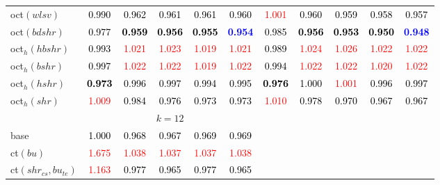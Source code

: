 \begin{tabular}[t]{l|>{}cccc>{}c|ccccc}
oct$(wlsv)$ & \textcolor{black}{0.990} & \textcolor{black}{0.962} & \textcolor{black}{0.961} & \textcolor{black}{0.961} & \textcolor{black}{0.960} & \textcolor{red}{1.001} & \textcolor{black}{0.960} & \textcolor{black}{0.959} & \textcolor{black}{0.958} & \textcolor{black}{0.957}\\
oct$(bdshr)$ & \textcolor{black}{0.977} & \textcolor{black}{\textbf{0.959}} & \textcolor{black}{\textbf{0.956}} & \textcolor{black}{\textbf{0.955}} & \textcolor{blue}{\textbf{0.954}} & \textcolor{black}{0.985} & \textcolor{black}{\textbf{0.956}} & \textcolor{black}{\textbf{0.953}} & \textcolor{black}{\textbf{0.950}} & \textcolor{blue}{\textbf{0.948}}\\
oct$_h(hbshr)$ & \textcolor{black}{0.993} & \textcolor{red}{1.021} & \textcolor{red}{1.023} & \textcolor{red}{1.019} & \textcolor{red}{1.021} & \textcolor{black}{0.989} & \textcolor{red}{1.024} & \textcolor{red}{1.026} & \textcolor{red}{1.022} & \textcolor{red}{1.022}\\
oct$_h(bshr)$ & \textcolor{black}{0.997} & \textcolor{red}{1.022} & \textcolor{red}{1.022} & \textcolor{red}{1.019} & \textcolor{red}{1.022} & \textcolor{black}{0.994} & \textcolor{red}{1.022} & \textcolor{red}{1.022} & \textcolor{red}{1.020} & \textcolor{red}{1.022}\\
oct$_h(hshr)$ & \textcolor{black}{\textbf{0.973}} & \textcolor{black}{0.996} & \textcolor{black}{0.997} & \textcolor{black}{0.994} & \textcolor{black}{0.995} & \textcolor{black}{\textbf{0.976}} & \textcolor{black}{1.000} & \textcolor{red}{1.001} & \textcolor{black}{0.996} & \textcolor{black}{0.997}\\
oct$_h(shr)$ & \textcolor{red}{1.009} & \textcolor{black}{0.984} & \textcolor{black}{0.976} & \textcolor{black}{0.973} & \textcolor{black}{0.973} & \textcolor{red}{1.010} & \textcolor{black}{0.978} & \textcolor{black}{0.970} & \textcolor{black}{0.967} & \textcolor{black}{0.967}\\
\addlinespace[0.3em]
\multicolumn{1}{c}{} & \multicolumn{5}{c}{\textbf{$k = 12$}} & \multicolumn{5}{c}{}\\
base & \textcolor{black}{1.000} & \textcolor{black}{0.968} & \textcolor{black}{0.967} & \textcolor{black}{0.969} & \textcolor{black}{0.969} &  &  &  &  & \\
ct$(bu)$ & \textcolor{red}{1.675} & \textcolor{red}{1.038} & \textcolor{red}{1.037} & \textcolor{red}{1.037} & \textcolor{red}{1.038} &  &  &  &  & \\
ct$(shr_{cs}, bu_{te})$ & \textcolor{red}{1.163} & \textcolor{black}{0.977} & \textcolor{black}{0.965} & \textcolor{black}{0.977} & \textcolor{black}{0.965} &  &  &  &  & \\

\end{tabular}

